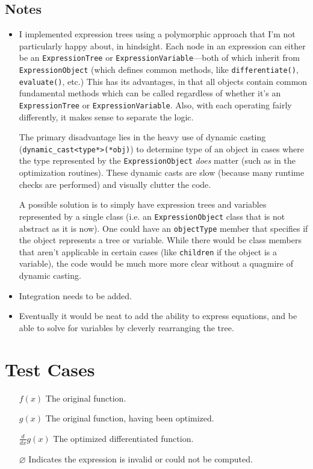 \documentclass{article}
\newenvironment{trials}
{\begin{enumerate}
  \setlength{\itemsep}{18pt}
  \setlength{\parskip}{0pt}
  \setlength{\parsep}{0pt}}
{\end{enumerate}}
\begin{document}
\subsection{Notes}
\begin{itemize}
\item I implemented expression trees using a polymorphic approach that I'm not particularly happy about, in hindsight. Each node in an expression can either be an \verb|ExpressionTree| or \verb|ExpressionVariable|---both of which inherit from \verb|ExpressionObject| (which defines common methods, like \verb|differentiate()|, \verb|evaluate()|, etc.) This has its advantages, in that all objects contain common fundamental methods which can be called regardless of whether it's an \verb|ExpressionTree| or \verb|ExpressionVariable|. Also, with each operating fairly differently, it makes sense to separate the logic.

The primary disadvantage lies in the heavy use of dynamic casting (\verb|dynamic_cast<type*>(*obj)|) to determine type of an object in cases where the type represented by the \verb|ExpressionObject| \emph{does} matter (such as in the optimization routines). These dynamic casts are slow (because many runtime checks are performed) and visually clutter the code.

A possible solution is to simply have expression trees and variables represented by a single class (i.e. an \verb|ExpressionObject| class that is not abstract as it is now). One could have an \verb|objectType| member that specifies if the object represents a tree or variable. While there would be class members that aren't applicable in certain cases (like \verb|children| if the object is a variable), the code would be much more more clear without a quagmire of dynamic casting.

\item Integration needs to be added.

\item Eventually it would be neat to add the ability to express equations, and be able to solve for variables by cleverly rearranging the tree. 

\end{itemize}

\section{Test Cases}
\begin{itemize}
\item[$f(x)$] The original function.
\item[$g(x)$] The original function, having been optimized.
\item[$\frac{d}{dx}g(x)$] The optimized differentiated function.
\item[$\varnothing$] Indicates the expression is invalid or could not be computed.
\end{itemize}
\nopagebreak
\begin{trials}

\end{trials}
\end{document}
